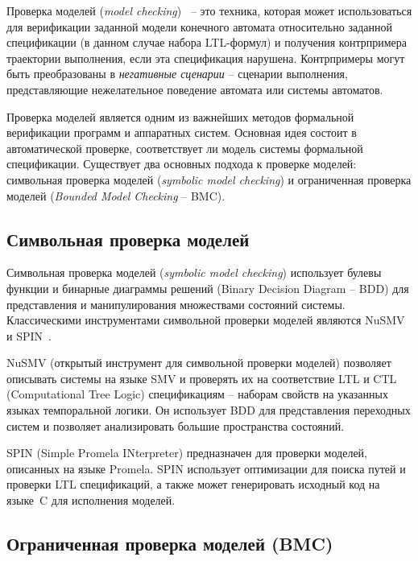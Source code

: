Проверка моделей (\textit{model checking})~\cite{clarke1999} \--- это техника, которая может использоваться для верификации заданной модели конечного автомата относительно заданной спецификации (в данном случае набора LTL-формул) и получения контрпримера траектории выполнения, если эта спецификация нарушена.
Контрпримеры могут быть преобразованы в \textit{негативные сценарии} \--- сценарии выполнения, представляющие нежелательное поведение автомата или системы автоматов.

Проверка моделей является одним из важнейших методов формальной верификации программ и аппаратных систем.
Основная идея состоит в автоматической проверке, соответствует ли модель системы формальной спецификации.
Существует два основных подхода к проверке моделей: символьная проверка моделей (\textit{symbolic model checking}) и ограниченная проверка моделей (\textit{Bounded Model Checking} \--- BMC).


\subsection{Символьная проверка моделей}

Символьная проверка моделей (\textit{symbolic model checking}) использует булевы функции и бинарные диаграммы решений (Binary Decision Diagram \--- BDD) для представления и манипулирования множествами состояний системы.
Классическими инструментами символьной проверки моделей являются NuSMV~\cite{nusmv} и SPIN~\cite{holzmann1997}.

NuSMV (открытый инструмент для символьной проверки моделей) позволяет описывать системы на языке SMV и проверять их на соответствие LTL и CTL (Computational Tree Logic) спецификациям \--- наборам свойств на указанных языках темпоральной логики.
Он использует BDD для представления переходных систем и позволяет анализировать большие пространства состояний.

SPIN (Simple Promela INterpreter) предназначен для проверки моделей, описанных на языке Promela.
SPIN использует оптимизации для поиска путей и проверки LTL спецификаций, а также может генерировать исходный код на языке~C для исполнения моделей.


\subsection{Ограниченная проверка моделей (BMC)}

